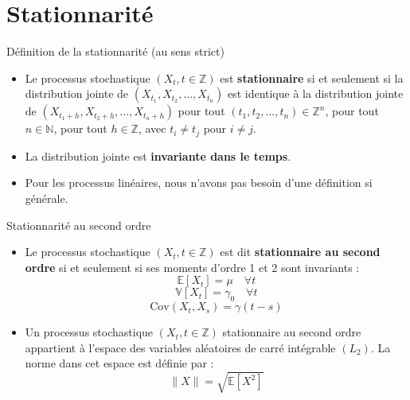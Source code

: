 \documentclass[11pt,aspectratio=169]{beamer}
\newcommand{\E}{\mathbb{E}}
\newcommand{\Var}{\mathbb{V}}
\newcommand{\Cov}{\mathrm{Cov}}
\newcommand{\Z}{\mathbb{Z}}
\newcommand{\N}{\mathbb{N}}
\begin{document}
\section{Stationnarité}

\begin{frame}{Définition de la stationnarité (au sens strict)}

\begin{itemize}

\item Le processus stochastique $(X_t, t \in \Z)$ est \textbf{stationnaire} si et seulement si la distribution jointe de $(X_{t_1}, X_{t_2}, \ldots, X_{t_n})$ est identique à la distribution jointe de $(X_{t_1+h}, X_{t_2+h}, \ldots, X_{t_n+h})$ pour tout $(t_1, t_2, \ldots, t_n) \in \Z^n$, pour tout $n \in \N$, pour tout $h \in \Z$, avec $t_i \neq t_j$ pour $i \neq j$.\newline

\item La distribution jointe est \textbf{invariante dans le temps}.\newline

\item Pour les processus linéaires, nous n'avons pas besoin d'une définition si générale.

\end{itemize}

\end{frame}

\begin{frame}{Stationnarité au second ordre}

\begin{itemize}

\item Le processus stochastique $(X_t, t \in \Z)$ est dit \textbf{stationnaire au second ordre} si et seulement si ses moments d'ordre 1 et 2 sont invariants :
  \[
  \E[X_t] = \mu \quad \forall t
  \]
  \[
  \Var[X_t] = \gamma_0 \quad \forall t
  \]
  \[
  \Cov(X_t, X_s) = \gamma(t-s)
  \]\newline

\item Un processus stochastique $(X_t, t \in \Z)$ stationnaire au second ordre appartient à l'espace des variables aléatoires de carré intégrable $(L_2)$. La norme dans cet espace est définie par :
  \[
  \|X\| = \sqrt{\E[X^2]}
  \]

\end{itemize}

\end{frame}
\end{document}
